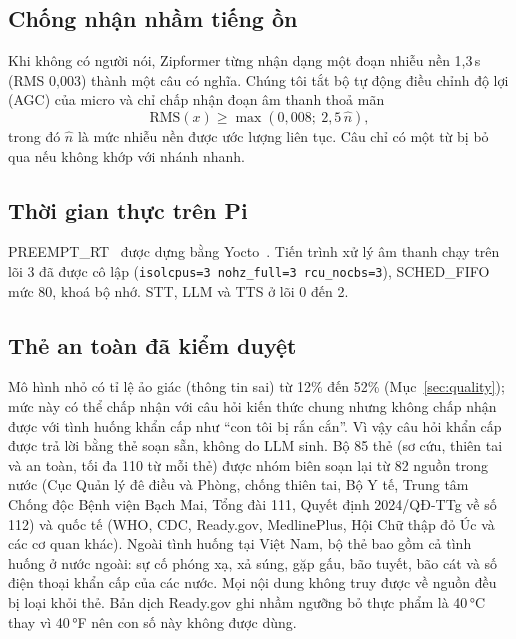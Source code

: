 \documentclass[a4paper,12pt,twocolumn]{article}
\begin{document}
\subsection{Chống nhận nhầm tiếng ồn}
Khi không có người nói, Zipformer từng nhận dạng một đoạn nhiễu nền 1,3\,s (RMS 0,003) thành một câu có nghĩa. Chúng tôi tắt bộ tự động điều chỉnh độ lợi (AGC) của micro và chỉ chấp nhận đoạn âm thanh thoả mãn
\begin{equation}
\text{RMS}(x) \ge \max(0{,}008;\ 2{,}5\,\hat{n}),
\end{equation}
trong đó $\hat{n}$ là mức nhiễu nền được ước lượng liên tục. Câu chỉ có một từ bị bỏ qua nếu không khớp với nhánh nhanh.

\subsection{Thời gian thực trên Pi}
PREEMPT\_RT~\cite{preemptrt} được dựng bằng Yocto~\cite{yocto}. Tiến trình xử lý âm thanh chạy trên lõi 3 đã được cô lập (\texttt{isolcpus=3 nohz\_full=3 rcu\_nocbs=3}), SCHED\_FIFO mức 80, khoá bộ nhớ. STT, LLM và TTS ở lõi 0 đến 2.

\subsection{Thẻ an toàn đã kiểm duyệt}
Mô hình nhỏ có tỉ lệ ảo giác (thông tin sai) từ 12\% đến 52\% (Mục~\ref{sec:quality}); mức này có thể chấp nhận với câu hỏi kiến thức chung nhưng không chấp nhận được với tình huống khẩn cấp như ``con tôi bị rắn cắn''. Vì vậy câu hỏi khẩn cấp được trả lời bằng thẻ soạn sẵn, không do LLM sinh. Bộ 85 thẻ (sơ cứu, thiên tai và an toàn, tối đa 110 từ mỗi thẻ) được nhóm biên soạn lại từ 82 nguồn trong nước (Cục Quản lý đê điều và Phòng, chống thiên tai, Bộ Y tế, Trung tâm Chống độc Bệnh viện Bạch Mai, Tổng đài 111, Quyết định 2024/QĐ-TTg về số 112) và quốc tế (WHO, CDC, Ready.gov, MedlinePlus, Hội Chữ thập đỏ Úc và các cơ quan khác). Ngoài tình huống tại Việt Nam, bộ thẻ bao gồm cả tình huống ở nước ngoài: sự cố phóng xạ, xả súng, gặp gấu, bão tuyết, bão cát và số điện thoại khẩn cấp của các nước. Mọi nội dung không truy được về nguồn đều bị loại khỏi thẻ. Bản dịch Ready.gov ghi nhầm ngưỡng bỏ thực phẩm là 40\,°C thay vì 40\,°F nên con số này không được dùng.
\end{document}
